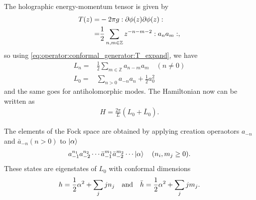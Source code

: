 \documentclass[10pt]{article}
\begin{document}
The holographic energy-momentum tensor is given by 
\begin{align}
    T(z)=&-2\pi g:\partial\phi(z)\partial\phi(z):\notag\\
        =&\frac{1}{2}\sum_{n,m\in\mathbb{Z}}z^{-n-m-2}:a_n a_m:,
\end{align}
so using \cref{eq:operator:conformal_generator:T_expand}, we have 
\begin{subequations}
    \begin{align}
        L_n=&\frac{1}{2}\sum_{m\in\mathbb{Z}}a_{n-m}a_m\quad(n\neq0)\\
        L_0=&\sum_{n>0}a_{-n}a_n+\frac{1}{2}a_0^2
    \end{align}
\end{subequations}
and the same goes for antiholomorphic modes.
The Hamiltonian now can be written as 
\begin{align}
    H=\frac{2\pi}{L}\left(L_0+\bar{L}_0\right).
\end{align}

The elements of the Fock space are obtained by applying creation operaotors $a_{-n}$ and $\bar{a}_{-n} (n>0)$ to $\ket{\alpha}$
\begin{align}
    a_{-1}^{n_1}a_{-2}^{n_2}\cdots\bar{a}_{-1}^{m_1}\bar{a}_{-2}^{m_2}\cdots\ket{\alpha}\quad(n_i,m_j\geq0).
\end{align}
These states are eigenstates of $L_0$ with conformal dimensions 
\begin{align}
    h=\frac{1}{2}\alpha^2+\sum_j j n_j\qand \bar{h}=\frac{1}{2}\alpha^2+\sum_j jm_j.
\end{align}
\end{document}

